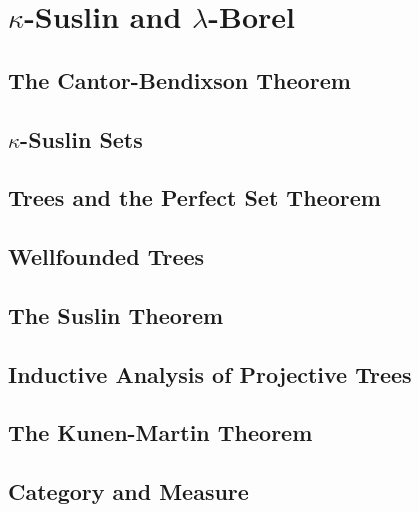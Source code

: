 \documentclass[openany]{book}
\begin{document}
\chapter{$\kappa$-Suslin and $\lambda$-Borel}

\section{The Cantor-Bendixson Theorem}

\section{$\kappa$-Suslin Sets}

\section{Trees and the Perfect Set Theorem}

\section{Wellfounded Trees}

\section{The Suslin Theorem}

\section{Inductive Analysis of Projective Trees}

\section{The Kunen-Martin Theorem}



\section{Category and Measure}


\end{document}
